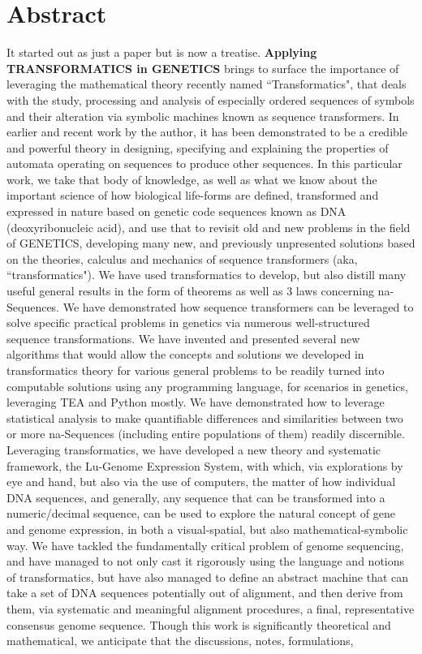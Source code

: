 \documentclass[a4paper, 18pt]{book} %
\begin{document}

\mainmatter

\chapter*{Abstract}
\large

It started out as just a paper but is now a treatise. \textbf{Applying TRANSFORMATICS in GENETICS} brings to surface the importance of leveraging the mathematical theory recently named ``Transformatics", that deals with the study, processing and analysis of especially ordered sequences of symbols and their alteration via symbolic machines known as sequence transformers. In earlier and recent work by the author, it has been demonstrated to be a credible and powerful theory in designing, specifying and explaining the properties of automata operating on sequences to produce other sequences. In this particular work, we take that body of knowledge, as well as what we know about the important science of how biological life-forms are defined, transformed and expressed in nature based on genetic code sequences known as DNA (deoxyribonucleic acid), and use that to revisit old and new problems in the field of GENETICS, developing many new, and previously unpresented solutions based on the theories, calculus and mechanics of sequence transformers (aka, ``transformatics"). We have used transformatics to develop, but also distill many useful general results in the form of theorems as well as 3 laws concerning na-Sequences. We have demonstrated how sequence transformers can be leveraged to solve specific practical problems in genetics via numerous well-structured sequence transformations. We have invented and presented several new algorithms that would allow the concepts and solutions we developed in transformatics theory for various general problems to be readily turned into computable solutions using any programming language, for scenarios in genetics, leveraging TEA and Python mostly. We have demonstrated how to leverage statistical analysis to make quantifiable differences and similarities between two or more na-Sequences (including entire populations of them) readily discernible. Leveraging transformatics, we have developed a new theory and systematic framework, the Lu-Genome Expression System, with which, via explorations by eye and hand, but also via the use of computers, the matter of how individual DNA sequences, and generally, any sequence that can be transformed into a numeric/decimal sequence, can be used to explore the natural concept of gene and genome expression, in both a visual-spatial, but also mathematical-symbolic way. We have tackled the fundamentally critical problem of genome sequencing, and have managed to not only cast it rigorously using the language and notions of transformatics, but have also managed to define an abstract machine that can take a set of DNA sequences potentially out of alignment, and then derive from them, via systematic and meaningful alignment procedures, a final, representative consensus genome sequence. Though this work is significantly theoretical and mathematical, we anticipate that the discussions, notes, formulations, 
\end{document}
